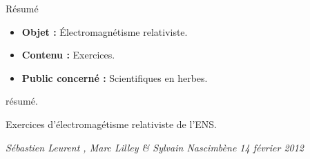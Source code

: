 \begin{center}
\Large
Résumé
\normalsize
\end{center}
\vspace{3cm}
\begin{itemize}[leftmargin=1cm, label=, itemsep=21pt]
\item {\bf Objet : } Électromagnétisme relativiste.
\item {\bf Contenu : } Exercices.
\item {\bf Public concerné : } Scientifiques en herbes.
\end{itemize}

\vspace{3cm}

résumé.

Exercices d'électromagétisme relativiste de l'ENS.
\vspace{3cm}

 {\it Sébastien Leurent , Marc Lilley \& Sylvain Nascimbène 14 février 2012} 

\vspace{3cm}

